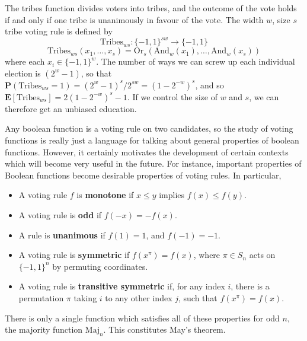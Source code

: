 \begin{example}
    The tribes function divides voters into tribes, and the outcome of the vote holds if and only if one tribe is unanimously in favour of the vote. The width $w$, size $s$ tribe voting rule is defined by
    \[ \text{Tribes}_{ws}: \{ -1, 1 \}^{sw} \to \{ -1, 1 \} \]
    \[ \text{Tribes}_{ws}(x_1, \dots, x_s) = \text{Or}_s(\text{And}_w(x_1), \dots, \text{And}_w(x_s)) \]
    where each $x_i \in \{ -1, 1 \}^w$. The number of ways we can screw up each individual election is $(2^w - 1)$, so that $\mathbf{P}(\text{Tribes}_{ws} = 1) = (2^w - 1)^s/2^{sw} = (1 - 2^{-w})^s$, and so $\mathbf{E}[\text{Tribes}_{ws}] = 2(1 - 2^{-w})^s - 1$. If we control the size of $w$ and $s$, we can therefore get an unbiased education.
\end{example}

Any boolean function is a voting rule on two candidates, so the study of voting functions is really just a language for talking about general properties of boolean functions. However, it certainly motivates the development of certain contexts which will become very useful in the future. For instance, important properties of Boolean functions become desirable properties of voting rules. In particular,
%
\begin{itemize}
    \item A voting rule $f$ is {\bf monotone} if $x \leq y$ implies $f(x) \leq f(y)$.
    \item A voting rule is {\bf odd} if $f(-x) = -f(x)$.
    \item A rule is {\bf unanimous} if $f(1) = 1$, and $f(-1) = -1$.
    \item A voting rule is {\bf symmetric} if $f(x^\pi) = f(x)$, where $\pi \in S_n$ acts on $\{ -1, 1 \}^n$ by permuting coordinates.
    \item A voting rule is {\bf transitive symmetric} if, for any index $i$, there is a permutation $\pi$ taking $i$ to any other index $j$, such that $f(x^\pi) = f(x)$.
\end{itemize}
%
There is only a single function which satisfies all of these properties for odd $n$, the majority function $\text{Maj}_n$. This constitutes May's theorem.

